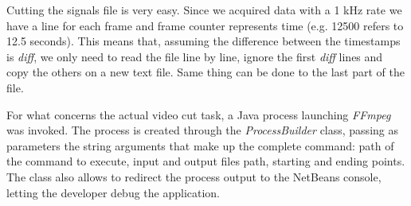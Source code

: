 \documentclass[binding=0.6cm,LaM]{sapthesis}
\begin{document}
Cutting the signals file is very easy. Since we acquired data with a 1 kHz rate we have a line for each frame and frame counter represents time (e.g. 12500 refers to 12.5 seconds). This means that, assuming the difference between the timestamps is \textit{diff}, we only need to read the file line by line, ignore the first \textit{diff} lines and copy the others on a new text file. Same thing can be done to the last part of the file.

For what concerns the actual video cut task, a Java process launching \textit{FFmpeg} was invoked. The process is created through the \textit{ProcessBuilder} class, passing as parameters the string arguments that make up the complete command: path of the command to execute, input and output files path, starting and ending points. The class also allows to redirect the process output to the NetBeans console, letting the developer debug the application.
\end{document}
